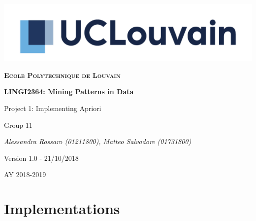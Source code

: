 \documentclass[11pt, a4paper]{article}
\begin{document}
	\begin{titlepage}
		\centering
		\includegraphics[scale =0.8]{logo.jpg}\par\vspace{1cm}
		{\scshape\LARGE\bfseries Ecole Polytechnique de Louvain\par}
		\vspace{1.5cm}
		{\scshape\Large \par}
		\vspace{1.5cm}
		{\huge\bfseries LINGI2364: Mining Patterns in Data \par}
		\vspace{1cm}
		{\Huge Project 1: Implementing Apriori \par}
		\vspace{2cm}
		{\LARGE Group 11\par}
		\vspace{1cm}
		{\Large\itshape Alessandra Rossaro (01211800), Matteo Salvadore (01731800)\par}
		\vspace{2cm}
		{\small Version 1.0 - 21/10/2018\par}

		\vfill

		{\large AY 2018-2019\par}
	\end{titlepage}

	\section{Implementations}
\end{document}

